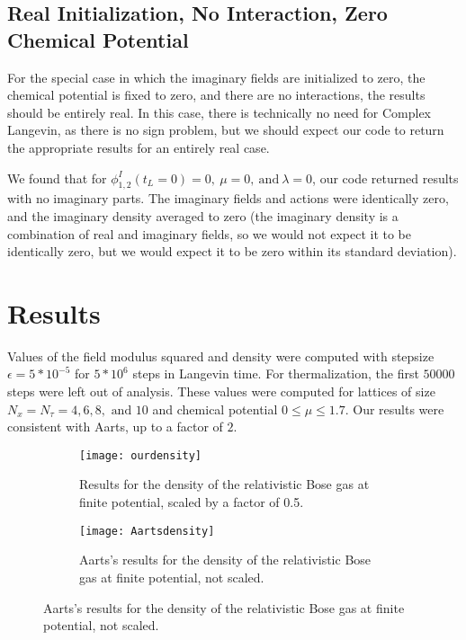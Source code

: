 \documentclass[../RotatingBosons.tex]{subfiles}
\begin{document}
\subsection{Real Initialization, No Interaction, Zero Chemical Potential} 
For the special case in which the imaginary fields are initialized to zero, the chemical potential is fixed to zero, and there are no interactions, the results should be entirely real. In this case, there is technically no need for Complex Langevin, as there is no sign problem, but we should expect our code to return the appropriate results for an entirely real case.

We found that for $\phi_{1,2}^{I}(t_{L} = 0) = 0,\ \mu = 0,\ \text{and}\ \lambda = 0$, our code returned results with no imaginary parts. The imaginary fields and actions were identically zero, and the imaginary density averaged to zero (the imaginary density is a combination of real and imaginary fields, so we would not expect it to be identically zero, but we would expect it to be zero within its standard deviation).
\section{Results}
Values of the field modulus squared and density were computed with stepsize $\epsilon = 5*10^{-5}$ for $5*10^{6}$ steps in Langevin time. For thermalization, the first $50000$ steps were left out of analysis. These values were computed for lattices of size $N_{x} = N_{\tau} = 4,6,8,\text{ and }10$ and chemical potential $0 \leq \mu \leq 1.7$. Our results were consistent with Aarts, up to a factor of $2$.

\begin{figure}[h]
	\begin{subfigure}[b]{0.5\textwidth}
      \texttt{[image: ourdensity]}
        \caption{Results for the density of the relativistic Bose gas at finite potential, scaled by a factor of 0.5.}
        \label{fig:ourdensity}
    \end{subfigure}
    \begin{subfigure}[b]{0.5\textwidth}
        \texttt{[image: Aartsdensity]}
        \caption{Aarts's results for the density of the relativistic Bose gas at finite potential, not scaled.}
        \label{fig:Aartsdensity}
    \end{subfigure}
\end{figure}
\end{document}
